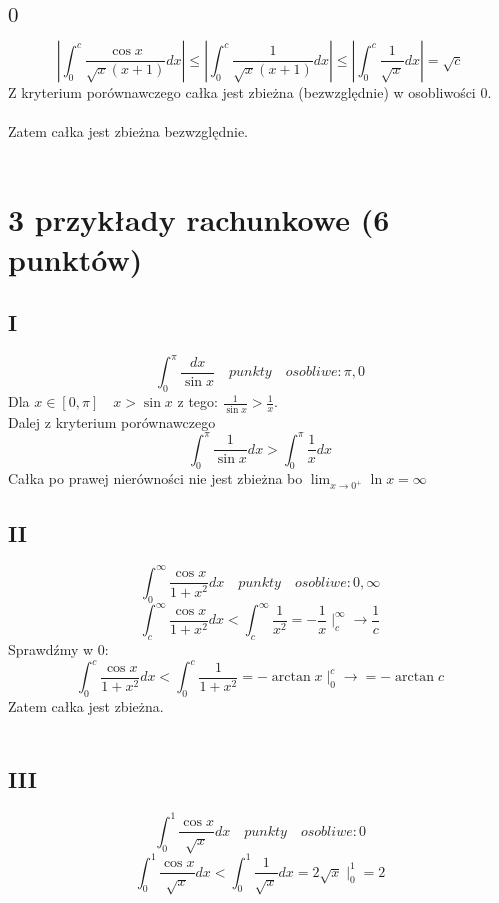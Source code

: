 \documentclass{article}
\begin{document}
\subsection*{$0$}
$$
\left| \int_{0}^{c} \frac{\cos x}{\sqrt x (x+1)} dx \right | \leq \left| \int_{0}^{c} \frac{1}{\sqrt x (x+1)} dx \right| \leq \left| \int_{0}^{c} \frac{1}{\sqrt x} dx \right| = \sqrt c
$$
Z kryterium porównawczego całka jest zbieżna (bezwzględnie) w osobliwości $0$.
\\\\
Zatem całka jest zbieżna bezwzględnie.\\\\
\section{3 przykłady rachunkowe (6 punktów)}
\subsection*{I}
$$
\int_0^\pi \frac{dx}{\sin x} \quad punkty\quad osobliwe: \pi, 0
$$
Dla $x \in [0,\pi] \quad x > \sin x$ z tego: $\frac{1}{\sin x} > \frac{1}{x}$.\\
Dalej z kryterium porównawczego
$$
\int_0^\pi \frac{1}{\sin x} dx > \int_0^\pi \frac{1}{x} dx
$$
Całka po prawej nierówności nie jest zbieżna bo $\lim_{x \to 0^+} \ln x = \infty$
\subsection*{II}
$$
\int_0^\infty \frac{\cos x}{1 + x^2}  dx\quad punkty\quad osobliwe: 0, \infty
$$
$$
\int_{c}^\infty \frac{\cos x}{1 + x^2}  dx < \int_{c}^\infty \frac{1}{x^2} = -\frac{1}{x} \mid^\infty_c \rightarrow 
\frac{1}{c}
$$
Sprawdźmy w 0:
$$
\int_{0}^{c} \frac{\cos x}{1 + x^2}  dx < \int_{0}^c \frac{1}{1 + x^2} = -\arctan x \mid^c_0 \rightarrow = -\arctan c
$$
Zatem całka jest zbieżna.\\\\
\subsection*{III}
$$
\int_0^1 \frac{\cos x}{\sqrt x} dx \quad punkty\quad osobliwe:  0
$$
$$
\int_0^1 \frac{\cos x}{\sqrt x} dx <\int_0^1 \frac{1}{\sqrt x} dx = 2 \sqrt x \mid^1_0 = 2
$$
\end{document}
